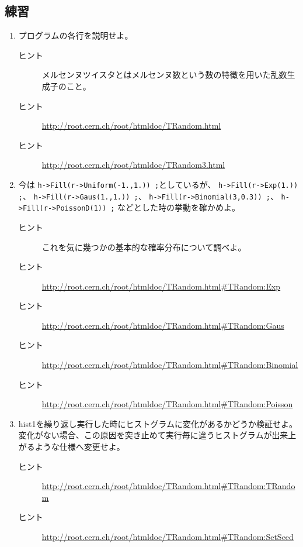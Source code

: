   \subsection{練習}

  \begin{enumerate}

   \item プログラムの各行を説明せよ。
	 \begin{description}
	  \item[ヒント] メルセンヌツイスタとはメルセンヌ数という数の特徴を用いた乱数生成子のこと。
	  \item[ヒント] \url{http://root.cern.ch/root/htmldoc/TRandom.html}
	  \item[ヒント] \url{http://root.cern.ch/root/htmldoc/TRandom3.html}
	 \end{description}

   \item 今は
	 \verb|h->Fill(r->Uniform(-1.,1.)) ;|としているが、
	 \verb|h->Fill(r->Exp(1.)) ;|、
	 \verb|h->Fill(r->Gaus(1.,1.)) ;|、
	 \verb|h->Fill(r->Binomial(3,0.3)) ;|、
	 \verb|h->Fill(r->PoissonD(1)) ;|
	 などとした時の挙動を確かめよ。
	 \begin{description}
	  \item[ヒント] これを気に幾つかの基本的な確率分布について調べよ。
	  \item[ヒント] \url{http://root.cern.ch/root/htmldoc/TRandom.html#TRandom:Exp}
	  \item[ヒント] \url{http://root.cern.ch/root/htmldoc/TRandom.html#TRandom:Gaus}
	  \item[ヒント] \url{http://root.cern.ch/root/htmldoc/TRandom.html#TRandom:Binomial}
	  \item[ヒント] \url{http://root.cern.ch/root/htmldoc/TRandom.html#TRandom:Poisson}
	 \end{description}

   \item hist1を繰り返し実行した時にヒストグラムに変化があるかどうか検証せよ。
	 変化がない場合、この原因を突き止めて実行毎に違うヒストグラムが出来上がるような仕様へ変更せよ。
	 \begin{description} 
	  \item[ヒント] \url{http://root.cern.ch/root/htmldoc/TRandom.html#TRandom:TRandom}
	  \item[ヒント] \url{http://root.cern.ch/root/htmldoc/TRandom.html#TRandom:SetSeed}
	 \end{description}
  \end{enumerate}

